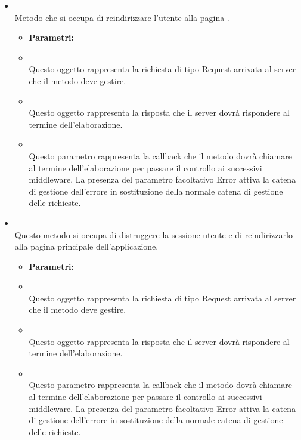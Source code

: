 \begin{itemize}
\item[] \textbf{} \\ Metodo che si occupa di reindirizzare l'utente alla pagina .
\begin{itemize}\addtolength{\itemsep}{-0.5\baselineskip}
\item[] \textbf{Parametri:}
\item[]  \\ Questo oggetto rappresenta la richiesta di tipo Request arrivata al server che il metodo deve gestire.
\item[]  \\ Questo oggetto rappresenta la risposta che il server dovrà rispondere al termine dell'elaborazione.
\item[]  \\ Questo parametro rappresenta la callback che il metodo dovrà chiamare al termine dell'elaborazione per passare il controllo ai successivi middleware. La presenza del parametro facoltativo Error attiva la catena di gestione dell'errore in sostituzione della normale catena di gestione delle richieste.
\end{itemize}
\item[] \textbf{} \\ Questo metodo si occupa di distruggere la sessione utente e di reindirizzarlo alla pagina principale dell'applicazione.
\begin{itemize}\addtolength{\itemsep}{-0.5\baselineskip}
\item[] \textbf{Parametri:}
\item[]  \\ Questo oggetto rappresenta la richiesta di tipo Request arrivata al server che il metodo deve gestire.
\item[]  \\ Questo oggetto rappresenta la risposta che il server dovrà rispondere al termine dell'elaborazione.
\item[]  \\ Questo parametro rappresenta la callback che il metodo dovrà chiamare al termine dell'elaborazione per passare il controllo ai successivi middleware. La presenza del parametro facoltativo Error attiva la catena di gestione dell'errore in sostituzione della normale catena di gestione delle richieste.

\end{itemize}
\end{itemize}
